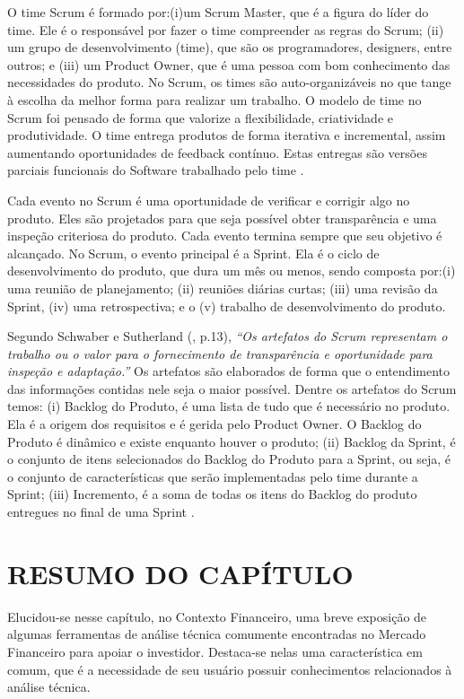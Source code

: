 O time Scrum é formado por:(i)um Scrum Master, que é a figura do líder do time. Ele é o responsável por fazer o time compreender as regras do Scrum; (ii) um grupo de desenvolvimento (time), que são os programadores, designers, entre outros; e (iii) um Product Owner, que é uma pessoa com bom conhecimento das necessidades do produto. No Scrum, os times são auto-organizáveis no que tange à escolha da melhor forma para realizar um trabalho. O modelo de time no Scrum foi pensado de forma que valorize a flexibilidade, criatividade e produtividade.  O time entrega produtos de forma iterativa e incremental, assim aumentando oportunidades de feedback contínuo. Estas entregas são versões parciais funcionais do Software trabalhado pelo time \cite[p. 5-7]{schwaber2013}.

Cada evento no Scrum é uma oportunidade de verificar e corrigir algo no produto. Eles são projetados para que seja possível obter transparência e uma inspeção criteriosa do produto. Cada evento termina sempre que seu objetivo é alcançado. No Scrum, o evento principal é a Sprint. Ela é o ciclo de desenvolvimento do produto, que dura um mês ou menos, sendo composta por:(i) uma reunião de planejamento; (ii) reuniões diárias curtas; (iii) uma revisão da Sprint, (iv) uma retrospectiva; e o  (v) trabalho de desenvolvimento do produto.

Segundo Schwaber e Sutherland (\citeyear{schwaber2013}, p.13), \textit{“Os artefatos do Scrum representam o trabalho ou o valor para o fornecimento de transparência e oportunidade para inspeção e adaptação.”} Os artefatos são elaborados de forma que o entendimento das informações contidas nele seja o maior possível. Dentre os artefatos do Scrum temos: (i) Backlog do Produto, é uma lista de tudo que é necessário no produto. Ela é a origem dos requisitos e é gerida pelo Product Owner. O Backlog do Produto é dinâmico e existe enquanto houver o produto; (ii) Backlog da Sprint, é o conjunto de itens selecionados do Backlog do Produto para a Sprint, ou seja, é o conjunto de características que serão implementadas pelo time durante a Sprint; (iii) Incremento, é a soma de todas os itens do Backlog do produto entregues no final de uma Sprint \cite[p. 13-15]{schwaber2013}. 


\section{RESUMO DO CAPÍTULO}

Elucidou-se nesse capítulo, no Contexto Financeiro, uma breve exposição de algumas ferramentas de análise técnica comumente encontradas no Mercado Financeiro para apoiar o investidor. Destaca-se nelas uma característica em comum, que é a necessidade de seu usuário possuir conhecimentos relacionados à análise técnica. 

